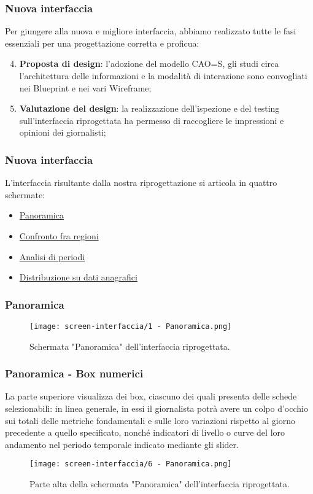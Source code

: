 \documentclass[../../main.tex]{subfiles}
\begin{document}
\begin{frame}
    \frametitle{Nuova interfaccia}
    Per giungere alla nuova e migliore interfaccia, abbiamo realizzato tutte le fasi essenziali per una progettazione corretta e proficua: 
    \begin{enumerate}
        \setcounter{enumi}{3}
        \item<1-> \textbf{Proposta di design}: l'adozione del modello CAO=S, gli studi circa l'architettura delle informazioni e la modalità di interazione sono convogliati nei Blueprint e nei vari Wireframe;
        \item<2-> \textbf{Valutazione del design}: la realizzazione dell'ispezione e del testing sull'interfaccia riprogettata ha permesso di raccogliere le impressioni e opinioni dei giornalisti;
    \end{enumerate}  

\end{frame}


\begin{frame}
    \frametitle{Nuova interfaccia}
    L'interfaccia risultante dalla nostra riprogettazione si articola in quattro schermate: 
    \begin{itemize}
        \item \hyperlink{panoramica}{Panoramica} 
        \item \hyperlink{confronto-regioni}{Confronto fra regioni}
        \item \hyperlink{analisi-periodi}{Analisi di periodi}
        \item \hyperlink{distribuzione}{Distribuzione su dati anagrafici}
    \end{itemize}  

\end{frame}

\begin{frame}
    \frametitle{Panoramica}
    \label{panoramica}
    \begin{figure}
        \centering
        \texttt{[image: screen-interfaccia/1 - Panoramica.png]}
        \caption{Schermata "Panoramica" dell'interfaccia riprogettata.}
    \end{figure}
    
\end{frame}

\begin{frame}
    \frametitle{Panoramica - Box numerici}
    La parte superiore visualizza dei box, ciascuno dei quali presenta delle schede selezionabili: in linea generale, in essi il giornalista potrà avere un colpo d'occhio sui totali delle metriche fondamentali e sulle loro variazioni rispetto al giorno precedente a quello specificato, nonché indicatori di livello o curve del loro andamento nel periodo temporale indicato mediante gli slider.
    \begin{figure}
        \centering
        \texttt{[image: screen-interfaccia/6 - Panoramica.png]}
        \caption{Parte alta della schermata "Panoramica" dell'interfaccia riprogettata.}
    \end{figure}

\end{frame}
\end{document}
